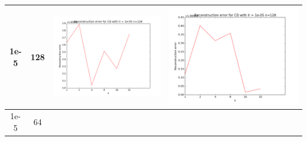 \documentclass[12pt]{report}
\begin{document}
\begin{table}[H]
\begin{tabular}{ | c | c | c | c |}
    1e-5 & 128 &
    \begin{minipage}{.3\textwidth}
      \includegraphics[scale=0.2]{train_cd_lr_0_00001_n_128.png}
    \end{minipage} &
    \begin{minipage}{.3\textwidth}
      \includegraphics[scale=0.2]{cd_lr_0_00001_n_128.png}
    \end{minipage}
    \\ \hline
    1e-5 & 64 &
    \begin{minipage}{.3\textwidth}

\end{minipage}
\end{tabular}
\end{table}
\end{document}
